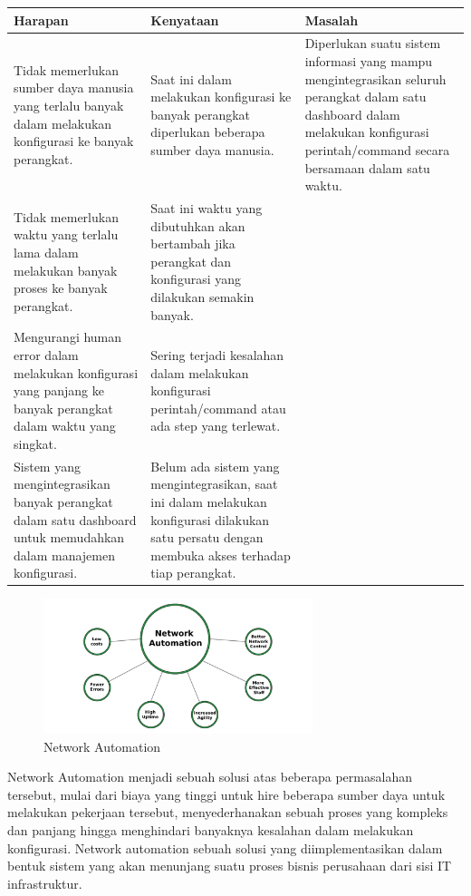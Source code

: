 \begin{tabular}{|>{\raggedright\arraybackslash}p{4cm}|>{\raggedright\arraybackslash}p{4cm}|>{\raggedright\arraybackslash}p{3.5cm}|}
\hline
\textbf{Harapan} & \textbf{Kenyataan} & \textbf{Masalah} \\
\hline
Tidak memerlukan sumber daya manusia yang terlalu banyak dalam melakukan konfigurasi ke banyak perangkat. & Saat ini dalam melakukan konfigurasi ke banyak perangkat diperlukan beberapa sumber daya manusia. & Diperlukan suatu sistem informasi yang mampu mengintegrasikan seluruh perangkat dalam satu dashboard dalam melakukan konfigurasi perintah/command secara bersamaan dalam satu waktu. \\
\hline
Tidak memerlukan waktu yang terlalu lama dalam melakukan banyak proses ke banyak perangkat. & Saat ini waktu yang dibutuhkan akan bertambah jika perangkat dan konfigurasi yang dilakukan semakin banyak. & \\
\hline
Mengurangi human error dalam melakukan konfigurasi yang panjang ke banyak perangkat dalam waktu yang singkat. & Sering terjadi kesalahan dalam melakukan konfigurasi perintah/command atau ada step yang terlewat. & \\
\hline
Sistem yang mengintegrasikan banyak perangkat dalam satu dashboard untuk memudahkan dalam manajemen konfigurasi. & Belum ada sistem yang mengintegrasikan, saat ini dalam melakukan konfigurasi dilakukan satu persatu dengan membuka akses terhadap tiap perangkat. & \\
\hline
\end{tabular}



\begin{figure}
	\centering
	\includegraphics[width=0.70\textwidth]
		{assets/pics/Network Automation.png}
	\caption{Network Automation}
	\label{fig:NetworkAutomation}
\end{figure}


Network Automation menjadi sebuah solusi atas beberapa permasalahan tersebut, mulai dari biaya yang tinggi untuk hire beberapa sumber daya untuk melakukan pekerjaan tersebut, menyederhanakan sebuah proses yang kompleks dan panjang hingga menghindari banyaknya kesalahan dalam melakukan konfigurasi. Network automation sebuah solusi yang diimplementasikan dalam bentuk sistem yang akan menunjang suatu proses bisnis perusahaan dari sisi IT infrastruktur.

